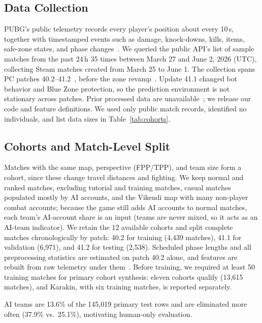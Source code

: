 \documentclass[sigconf,anonymous,nonacm]{acmart}
\begin{document}
\subsection{Data Collection}
\label{sec:method:data}
PUBG's public telemetry records every player's position about every 10\,s, together with timestamped events such as damage, knock-downs, kills, items, safe-zone states, and phase changes~\cite{PUBGAPI}.
We queried the public API's list of sample matches from the past 24\,h 35 times between March 27 and June 2, 2026 (UTC), collecting Steam matches created from March 25 to June 1.
The collection spans PC patches 40.2--41.2~\cite{PUBGPatchNotes2026}, before the zone revamp~\cite{PUBGBlueZone2026}. Update 41.1 changed bot behavior and Blue Zone protection, so the prediction environment is not stationary across patches.
Prior processed data are unavailable~\cite{Sagong25a,KRAFTON}; we release our code and feature definitions.
We used only public match records, identified no individuals, and list data sizes in Table~\ref{tab:cohorts}.

\subsection{Cohorts and Match-Level Split}
\label{sec:method:cohort}
Matches with the same map, perspective (FPP/TPP), and team size form a cohort, since these change travel distances and fighting.
We keep normal and ranked matches, excluding tutorial and training matches, casual matches populated mostly by AI accounts, and the Vikendi map with many non-player combat accounts; because the game still adds AI accounts to normal matches, each team's AI-account share is an input (teams are never mixed, so it acts as an AI-team indicator).
We retain the 12 available cohorts and split complete matches chronologically by patch: 40.2 for training (4,439 matches), 41.1 for validation (6,971), and 41.2 for testing (2,538). Scheduled phase lengths and all preprocessing statistics are estimated on patch 40.2 alone, and features are rebuilt from raw telemetry under them~\cite{Kaufman12}. Before training, we required at least 50 training matches for primary cohort synthesis: eleven cohorts qualify (13,615 matches), and Karakin, with six training matches, is reported separately.

AI teams are 13.6\% of the 145,019 primary test rows and are eliminated more often (37.9\% vs.\ 25.1\%), motivating human-only evaluation.
\end{document}
